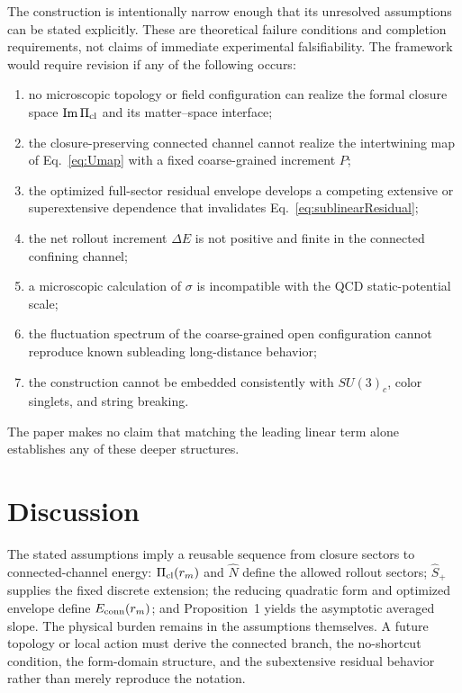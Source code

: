 \documentclass[10pt]{article}
\begin{document}
The construction is intentionally narrow enough that its unresolved assumptions can be stated explicitly. These are theoretical failure conditions and completion requirements, not claims of immediate experimental falsifiability. The framework would require revision if any of the following occurs:

\begin{enumerate}[label=(\roman*)]
\item no microscopic topology or field configuration can realize the formal closure space $\operatorname{Im}\Pi_{\rm cl}$ and its matter--space interface;
\item the closure-preserving connected channel cannot realize the intertwining map of Eq.~\eqref{eq:Umap} with a fixed coarse-grained increment $P$;
\item the optimized full-sector residual envelope develops a competing extensive or superextensive dependence that invalidates Eq.~\eqref{eq:sublinearResidual};
\item the net rollout increment $\Delta E$ is not positive and finite in the connected confining channel;
\item a microscopic calculation of $\sigma$ is incompatible with the QCD static-potential scale;
\item the fluctuation spectrum of the coarse-grained open configuration cannot reproduce known subleading long-distance behavior;
\item the construction cannot be embedded consistently with $SU(3)_c$, color singlets, and string breaking.
\end{enumerate}

The paper makes no claim that matching the leading linear term alone establishes any of these deeper structures.

\balance
\section{Discussion}
\label{sec:discussion}

The stated assumptions imply a reusable sequence from closure sectors to connected-channel energy: $\Pi_{\rm cl}(r_m)$ and $\hat N$ define the allowed rollout sectors; $\hat S_+$ supplies the fixed discrete extension; the reducing quadratic form and optimized envelope define $E_{\rm conn}(r_m)$; and Proposition~1 yields the asymptotic averaged slope. The physical burden remains in the assumptions themselves. A future topology or local action must derive the connected branch, the no-shortcut condition, the form-domain structure, and the subextensive residual behavior rather than merely reproduce the notation.
\end{document}
